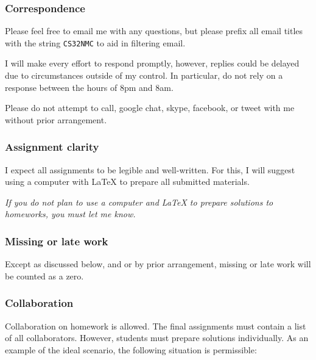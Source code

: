 \documentclass{article}
\begin{document}
\hypertarget{correspondence_15}{}\subsubsection*{{Correspondence}}\label{correspondence_15}

Please feel free to email me with any questions, but please prefix all email titles with the string {\colorbox[rgb]{1.00,0.93,1.00}{\tt CS\char32NMC}} to aid in filtering email.

I will make every effort to respond promptly, however, replies could be delayed due to circumstances outside of my control. In particular, do not rely on a response between the hours of 8pm and 8am.

Please do not attempt to call, google chat, skype, facebook, or tweet with me without prior arrangement.

\hypertarget{assignment_clarity_16}{}\subsubsection*{{Assignment clarity}}\label{assignment_clarity_16}

I expect all assignments to be legible and well-written. For this, I will suggest using a computer with \LaTeX\xspace  to prepare all submitted materials.

\emph{If you do not plan to use a computer and \LaTeX\xspace  to prepare solutions to homeworks, you must let me know.}

\hypertarget{missing_or_late_work_17}{}\subsubsection*{{Missing or late work}}\label{missing_or_late_work_17}

Except as discussed below, and or by prior arrangement, missing or late work will be counted as a zero.

\hypertarget{collaboration_18}{}\subsubsection*{{Collaboration}}\label{collaboration_18}

Collaboration on homework is allowed. The final assignments must contain a list of all collaborators. However, students must prepare solutions individually. As an example of the ideal scenario, the following situation is permissible:
\end{document}
